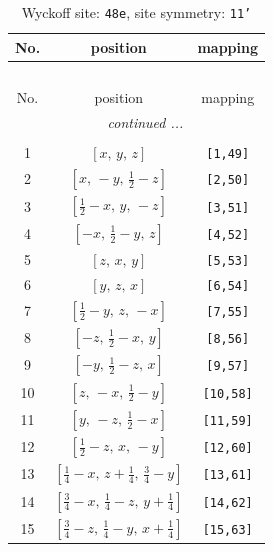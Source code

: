 \documentclass[fleqn,8pt]{jsarticle}
\begin{document}
\renewcommand{\arraystretch}{1.2}
\begin{longtable}{ccc}
\caption{Wyckoff site: {\tt 48e}, site symmetry: {\tt 11'}}
 \\
 \hline \hline
No. & position & mapping \\ \hline \endfirsthead

\multicolumn{2}{l}{\tablename\ \thetable{}} \\
 \hline \hline
No. & position & mapping \\ \hline \endhead

 \hline \hline
\multicolumn{2}{r}{\footnotesize\it continued ...} \\ \endfoot

 \hline \hline
\multicolumn{2}{r}{} \\ \endlastfoot

1 & $\left[ x,\, y,\, z \right]$ & {\tt [1,49]} \\ \hline
2 & $\left[ x,\, - y,\, \frac{1}{2} - z \right]$ & {\tt [2,50]} \\ \hline
3 & $\left[ \frac{1}{2} - x,\, y,\, - z \right]$ & {\tt [3,51]} \\ \hline
4 & $\left[ - x,\, \frac{1}{2} - y,\, z \right]$ & {\tt [4,52]} \\ \hline
5 & $\left[ z,\, x,\, y \right]$ & {\tt [5,53]} \\ \hline
6 & $\left[ y,\, z,\, x \right]$ & {\tt [6,54]} \\ \hline
7 & $\left[ \frac{1}{2} - y,\, z,\, - x \right]$ & {\tt [7,55]} \\ \hline
8 & $\left[ - z,\, \frac{1}{2} - x,\, y \right]$ & {\tt [8,56]} \\ \hline
9 & $\left[ - y,\, \frac{1}{2} - z,\, x \right]$ & {\tt [9,57]} \\ \hline
10 & $\left[ z,\, - x,\, \frac{1}{2} - y \right]$ & {\tt [10,58]} \\ \hline
11 & $\left[ y,\, - z,\, \frac{1}{2} - x \right]$ & {\tt [11,59]} \\ \hline
12 & $\left[ \frac{1}{2} - z,\, x,\, - y \right]$ & {\tt [12,60]} \\ \hline
13 & $\left[ \frac{1}{4} - x,\, z + \frac{1}{4},\, \frac{3}{4} - y \right]$ & {\tt [13,61]} \\ \hline
14 & $\left[ \frac{3}{4} - x,\, \frac{1}{4} - z,\, y + \frac{1}{4} \right]$ & {\tt [14,62]} \\ \hline
15 & $\left[ \frac{3}{4} - z,\, \frac{1}{4} - y,\, x + \frac{1}{4} \right]$ & {\tt [15,63]} \\ \hline

\end{longtable}
\end{document}
